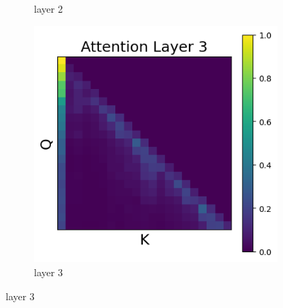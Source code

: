 \documentclass[11pt]{article}
\begin{document}
\begin{figure}[t]
\begin{subfigure}[t]{0.24\textwidth}
    \caption{layer 2}
  \end{subfigure}\hfill
  \begin{subfigure}[t]{0.24\textwidth}
    \centering
    \includegraphics[width=1.4\columnwidth]{figures/intervention5/layer_3.png}
    \caption{layer 3}
  \end{subfigure}\hfill


\end{figure}
\end{document}
